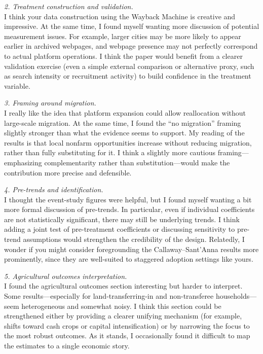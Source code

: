 \documentclass[12pt]{article}
\begin{document}
\textit{2. Treatment construction and validation.} \\
I think your data construction using the Wayback Machine is creative and impressive. At the same time, I found myself wanting more discussion of potential measurement issues. For example, larger cities may be more likely to appear earlier in archived webpages, and webpage presence may not perfectly correspond to actual platform operations. I think the paper would benefit from a clearer validation exercise (even a simple external comparison or alternative proxy, such as search intensity or recruitment activity) to build confidence in the treatment variable.

\textit{3. Framing around migration.} \\
I really like the idea that platform expansion could allow reallocation without large-scale migration. At the same time, I found the “no migration” framing slightly stronger than what the evidence seems to support. My reading of the results is that local nonfarm opportunities increase without reducing migration, rather than fully substituting for it. I think a slightly more cautious framing—emphasizing complementarity rather than substitution—would make the contribution more precise and defensible.

\textit{4. Pre-trends and identification.} \\
I thought the event-study figures were helpful, but I found myself wanting a bit more formal discussion of pre-trends. In particular, even if individual coefficients are not statistically significant, there may still be underlying trends. I think adding a joint test of pre-treatment coefficients or discussing sensitivity to pre-trend assumptions would strengthen the credibility of the design. Relatedly, I wonder if you might consider foregrounding the Callaway–Sant’Anna results more prominently, since they are well-suited to staggered adoption settings like yours.

\textit{5. Agricultural outcomes interpretation.} \\
I found the agricultural outcomes section interesting but harder to interpret. Some results—especially for land-transferring-in and non-transferee households—seem heterogeneous and somewhat noisy. I think this section could be strengthened either by providing a clearer unifying mechanism (for example, shifts toward cash crops or capital intensification) or by narrowing the focus to the most robust outcomes. As it stands, I occasionally found it difficult to map the estimates to a single economic story.
\end{document}
